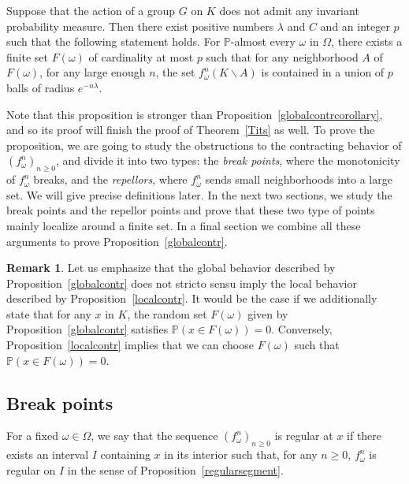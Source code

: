 \documentclass[10pt]{amsart}
\theoremstyle{definition}\newtheorem{defi}[theo]{Definition}\newtheorem{rema}[theo]{Remark}\newtheorem{exam}[theo]{Example}\newtheorem{exem}[theo]{Example}\newtheorem{nota}[theo]{Notation}
\newcommand{\bbP}{\mathbb{P}}
\newcounter{setofcase}
\newcounter{case}[setofcase]
\begin{document}
\begin{prop}\label{globalcontr}
Suppose that the action of a group $G$ on $K$ does not admit any invariant probability measure. Then there exist positive numbers $\lambda$ and $C$ and an integer $p$ such that the following statement holds. For $\bbP$-almost every $\omega$ in $\Omega$, there exists a finite set $F(\omega)$ of cardinality at most $p$ such that for any neighborhood $A$ of $F(\omega)$, for any large enough $n$, the set $f_\omega^n(K\backslash A)$ is contained in a union of $p$ balls of radius $e^{-n\lambda}$.
\end{prop}


Note that this proposition is stronger than Proposition~\ref{globalcontrcorollary}, and so its proof will finish the proof of Theorem~\ref{Tits} as well. To prove the proposition, we are going to study the obstructions to the contracting behavior of $(f_\omega^n)_{n\geq 0}$, and divide it into two types: the \emph{break points}, where the monotonicity of $f_\omega^n$ breaks, and the \emph{repellors}, where $f_\omega^n$ sends small neighborhoods into a large set. We will give precise definitions later. In the next two sections, we study the break points and the repellor points and prove that these two type of points mainly localize around a finite set. In a final section we combine all these arguments to prove Proposition~\ref{globalcontr}.

\begin{rema}
Let us emphasize that the global behavior described by Proposition~\ref{globalcontr} does not stricto sensu imply the local behavior described by Proposition~\ref{localcontr}. It would be the case if we additionally state that for any $x$ in $K$, the random set $F(\omega)$ given by Proposition~\ref{globalcontr} satisfies $\bbP(x\in F(\omega))=0$. Conversely, Proposition~\ref{localcontr} implies that we can choose $F(\omega)$ such that $\bbP(x\in F(\omega))=0$.
\end{rema}



\subsection{Break points}

For a fixed $\omega \in \Omega$, we say that the sequence $(f_\omega^n)_{n\geq 0}$ is regular at $x$ if there exists an interval $I$ containing $x$ in its interior such that, for any $n\geq 0$, $f_\omega^n$ is regular on $I$ in the sense of Proposition~\ref{regularsegment}.
\end{document}
